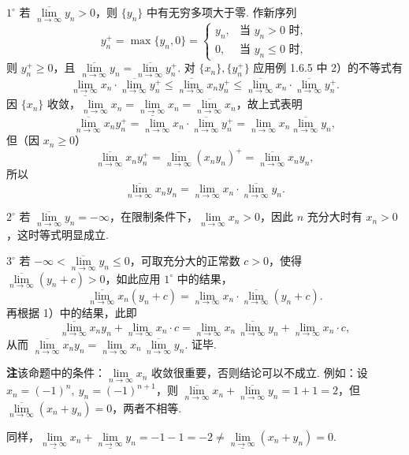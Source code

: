 \documentclass[UTF8, 12pt, fontset=fandol, oneside]{ctexart}
\begin{document}
$1^\circ$ 若 $\overline{\lim\limits_{n\to\infty}}y_n>0$，则 $\{y_n\}$ 中有无穷多项大于零. 作新序列
\[
  y_n^+=\max\{y_n,0\}=
  \begin{cases}
    y_n, & \text{当 }y_n>0\text{ 时},\\
    0, & \text{当 }y_n\le0\text{ 时},
  \end{cases}
\]
则 $y_n^+\ge0$，且 $\overline{\lim\limits_{n\to\infty}}y_n=\overline{\lim\limits_{n\to\infty}}y_n^+$. 对 $\{x_n\},\{y_n^+\}$ 应用例 1.6.5 中 2）的不等式有
\[
  \underline{\lim_{n\to\infty}}x_n\cdot\overline{\lim_{n\to\infty}}y_n^+
  \le \overline{\lim_{n\to\infty}}x_ny_n^+
  \le \overline{\lim_{n\to\infty}}x_n\cdot\overline{\lim_{n\to\infty}}y_n^+.
\]
因 $\{x_n\}$ 收敛，$\lim\limits_{n\to\infty}x_n=\underline{\lim\limits_{n\to\infty}}x_n=\overline{\lim\limits_{n\to\infty}}x_n$，故上式表明
\[
  \overline{\lim_{n\to\infty}}x_ny_n^+
  =\lim_{n\to\infty}x_n\cdot\overline{\lim_{n\to\infty}}y_n^+
  =\lim_{n\to\infty}x_n\overline{\lim_{n\to\infty}}y_n,
\]
但（因 $x_n\ge0$）
\[
  \overline{\lim_{n\to\infty}}x_ny_n^+
  =\overline{\lim_{n\to\infty}}(x_ny_n)^+
  =\overline{\lim_{n\to\infty}}x_ny_n,
\]
所以
\[
  \overline{\lim_{n\to\infty}}x_ny_n
  =\lim_{n\to\infty}x_n\cdot\overline{\lim_{n\to\infty}}y_n.
\]

$2^\circ$ 若 $\overline{\lim\limits_{n\to\infty}}y_n=-\infty$，在限制条件下，$\lim\limits_{n\to\infty}x_n>0$，因此 $n$ 充分大时有 $x_n>0$，这时等式明显成立.

$3^\circ$ 若 $-\infty<\overline{\lim\limits_{n\to\infty}}y_n\le0$，可取充分大的正常数 $c>0$，使得 $\overline{\lim\limits_{n\to\infty}}(y_n+c)>0$，如此应用 $1^\circ$ 中的结果，
\[
  \overline{\lim_{n\to\infty}}x_n(y_n+c)
  =\lim_{n\to\infty}x_n\cdot\overline{\lim_{n\to\infty}}(y_n+c).
\]
再根据 1）中的结果，此即
\[
  \overline{\lim_{n\to\infty}}x_ny_n+\lim_{n\to\infty}x_n\cdot c
  =\lim_{n\to\infty}x_n\,\overline{\lim_{n\to\infty}}y_n+\lim_{n\to\infty}x_n\cdot c,
\]
从而 $\overline{\lim\limits_{n\to\infty}}x_ny_n
=\lim\limits_{n\to\infty}x_n\,\overline{\lim\limits_{n\to\infty}}y_n$. 证毕.

\noindent\textbf{注}\quad 该命题中的条件：$\lim\limits_{n\to\infty}x_n$ 收敛很重要，否则结论可以不成立. 例如：设 $x_n=(-1)^n,\ y_n=(-1)^{n+1}$，则 $\overline{\lim\limits_{n\to\infty}}x_n+\overline{\lim\limits_{n\to\infty}}y_n=1+1=2$，但 $\overline{\lim\limits_{n\to\infty}}(x_n+y_n)=0$，两者不相等.

同样，$\underline{\lim\limits_{n\to\infty}}x_n+\underline{\lim\limits_{n\to\infty}}y_n=-1-1=-2\ne \underline{\lim\limits_{n\to\infty}}(x_n+y_n)=0$.
\end{document}
